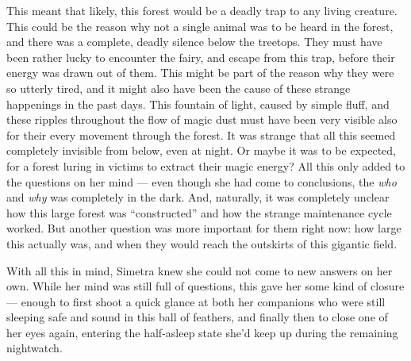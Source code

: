 This meant that likely, this forest would be a deadly trap to any living creature. This could be the reason why not a single animal was to be heard in the forest, and there was a complete, deadly silence below the treetops. They must have been rather lucky to encounter the fairy, and escape from this trap, before their energy was drawn out of them. This might be part of the reason why they were so utterly tired, and it might also have been the cause of these strange happenings in the past days. This fountain of light, caused by simple fluff, and these ripples throughout the flow of magic dust must have been very visible also for their every movement through the forest. It was strange that all this seemed completely invisible from below, even at night. Or maybe it was to be expected, for a forest luring in victims to extract their magic energy? All this only added to the questions on her mind --- even though she had come to conclusions, the \emph{who} and \emph{why} was completely in the dark. And, naturally, it was completely unclear how this large forest was \enquote{constructed} and how the strange maintenance cycle worked. But another question was more important for them right now: how large this actually was, and when they would reach the outskirts of this gigantic field.

With all this in mind, Simetra knew she could not come to new answers on her own. While her mind was still full of questions, this gave her some kind of closure --- enough to first shoot a quick glance at both her companions who were still sleeping safe and sound in this ball of feathers, and finally then to close one of her eyes again, entering the half-asleep state she'd keep up during the remaining nightwatch.
